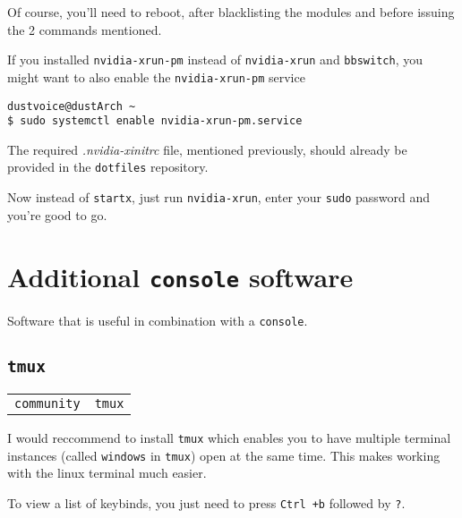 \documentclass[9pt]{report}
\newenvironment{NOTE}
{\begin{tcolorbox}[colback=admonitionBG,coltitle=draculaFG,colframe=draculaBlue,colbacktitle=draculaBlue,title=NOTE]}
{\end{tcolorbox}}
\newenvironment{packagetable}
{\begin{longtabu}to \textwidth [b]{X[1,r]|X[1,l]}}
{\end{longtabu}}
\begin{document}
\begin{NOTE}
    Of course, you’ll need to reboot, after blacklisting the modules and before issuing the 2 commands mentioned.

\end{NOTE}
\begin{NOTE}
    If you installed \texttt{nvidia-xrun-pm} instead of \texttt{nvidia-xrun} and \texttt{bbswitch}, you might want to also enable the \texttt{nvidia-xrun-pm} service


    \begin{verbatim}
dustvoice@dustArch ~
$ sudo systemctl enable nvidia-xrun-pm.service
    \end{verbatim}
\end{NOTE}
\begin{NOTE}
    The required \textit{.nvidia-xinitrc} file, mentioned previously, should already be provided in the \texttt{dotfiles} repository.

\end{NOTE}
Now instead of \texttt{startx}, just run \texttt{nvidia-xrun}, enter your \texttt{sudo} password and you’re good to go.



\newpage

\hypertarget{x-additional-console-software}{\section{Additional \texttt{console} software}}
Software that is useful in combination with a \texttt{console}.



\newpage

\hypertarget{x-tmux}{\subsection{\texttt{tmux}}}
\begin{packagetable}
    \texttt{community} & \texttt{tmux} \\ 
\end{packagetable}

I would reccommend to install \texttt{tmux} which enables you to have multiple terminal instances (called \texttt{windows} in \texttt{tmux}) open at the same time.
This makes working with the linux terminal much easier.


\begin{NOTE}
    To view a list of keybinds, you just need to press \texttt{Ctrl +b} followed by \texttt{?}.

\end{NOTE}
\end{document}
